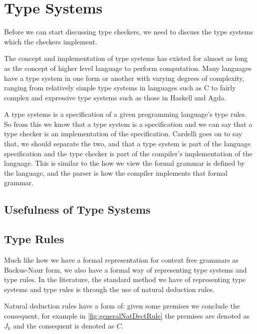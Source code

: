 \section{Type Systems}
Before we can start discussing type checkers, we need to discuss the type systems which the checkers implement.

The concept and implementation of type systems has existed for almost as long as the concept of higher level language to perform computation\cite{Backus:1978:HFI:960118.808380}.
Many languages have a type system in one form or another with varying degrees of complexity,
ranging from relatively simple type systems in languages such as C to fairly complex and expressive type systems such as those in Haskell and Agda.

A type systems is a specification of a given programming language's type rules\cite{cardelli1996type}.
So from this we know that a type system is a specification and we can say that a type checker is an implementation of the specification.
Cardelli goes on to say that, we should separate the two, and that a type system is part of the language specification and the type checker is part of the compiler's implementation of the language\cite{cardelli1996type}.
This is similar to the how we view the formal grammar is defined by the language, and the parser is how the compiler implements that formal grammar\cite{cardelli1996type}.

\subsection{Usefulness of Type Systems}


\subsection{Type Rules}

Much like how we have a formal representation for context free grammars as Backus-Naur form\cite{Backus1960,aho2003compilers,ranta2012implementing}, we also have a formal way of representing type systems and type rules.
In the literature, the standard method we have of representing type systems and type rules is through the use of natural deduction rules\cite{cardelli1996type,ranta2012implementing}.

Natural deduction rules have a form of: given some premises we conclude the consequent\cite{prawitz2006natural,ranta2012implementing}, for example in \autoref{fig:generalNatDectRule} the premises are denoted as $J_k$ and the consequent is denoted as $C$.

